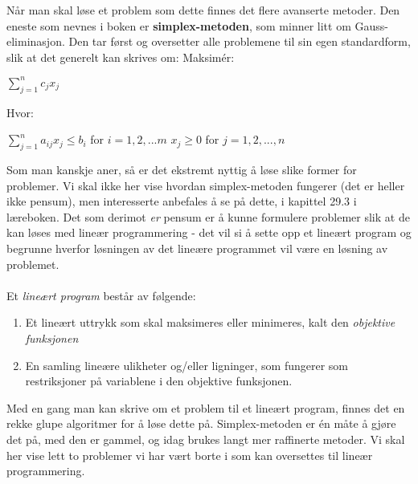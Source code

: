 \noindent Når man skal løse et problem som dette finnes det flere avanserte metoder. Den eneste som nevnes i boken er \textbf{simplex-metoden}, som minner litt om Gauss-eliminasjon. Den tar først og oversetter alle problemene til sin egen standardform, slik at det generelt kan skrives om:
\newline
\newline
Maksimér:
\begin{center}
$\sum\limits_{j=1}^n c_j x_j$
\end{center}
Hvor:
\begin{center}
$\sum\limits_{j=1}^n a_{ij} x_j \leq b_i$ for $i = 1, 2, ...m$ \newline
$x_j \geq 0$ for $j = 1, 2, ..., n$
\end{center}

Som man kanskje aner, så er det ekstremt nyttig å løse slike former for problemer. Vi skal ikke her vise hvordan simplex-metoden fungerer (det er heller ikke pensum), men interesserte anbefales å se på dette, i kapittel 29.3 i læreboken. Det som derimot \textit{er} pensum er å kunne formulere problemer slik at de kan løses med lineær programmering - det vil si å sette opp et lineært program og begrunne hverfor løsningen av det lineære programmet vil være en løsning av problemet.
\\\\
Et \textit{lineært program} består av følgende:
\begin{enumerate}
    \item Et lineært uttrykk som skal maksimeres eller minimeres, kalt den \textit{objektive funksjonen}
    \item En samling lineære ulikheter og/eller ligninger, som fungerer som restriksjoner på variablene i den objektive funksjonen.
\end{enumerate}

\noindent Med en gang man kan skrive om et problem til et lineært program, finnes det en rekke glupe algoritmer for å løse dette på. Simplex-metoden er én måte å gjøre det på, med den er gammel, og idag brukes langt mer raffinerte metoder. Vi skal her vise lett to problemer vi har vært borte i som kan oversettes til lineær programmering.

